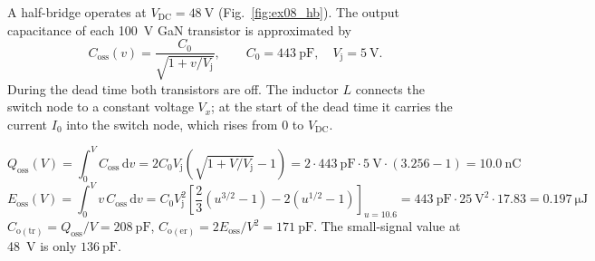 


A half-bridge operates at $V_\mathrm{DC}=\SI{48}{\volt}$ (Fig.~\ref{fig:ex08_hb}). The output capacitance of each \SI{100}{\volt} GaN transistor is approximated by
\begin{equation}
	C_\mathrm{oss}(v)=\frac{C_0}{\sqrt{1+v/V_\mathrm{j}}},\qquad C_0=\SI{443}{\pico\farad},\quad V_\mathrm{j}=\SI{5}{\volt}.
\end{equation}
During the dead time both transistors are off. The inductor $L$ connects the switch node to a constant voltage $V_x$; at the start of the dead time it carries the current $I_0$ into the switch node, which rises from 0 to $V_\mathrm{DC}$.




\begin{solutionblock}
	\begin{equation}
		Q_\mathrm{oss}(V)=\int_0^VC_\mathrm{oss}\,\mathrm{d}v=2C_0V_\mathrm{j}\left(\sqrt{1+V/V_\mathrm{j}}-1\right)=2\cdot\SI{443}{\pico\farad}\cdot\SI{5}{\volt}\cdot(3.256-1)=\SI{10.0}{\nano\coulomb}
	\end{equation}
	\begin{equation}
		E_\mathrm{oss}(V)=\int_0^Vv\,C_\mathrm{oss}\,\mathrm{d}v=C_0V_\mathrm{j}^2\left[\frac{2}{3}\left(u^{3/2}-1\right)-2\left(u^{1/2}-1\right)\right]_{u=10.6}=\SI{443}{\pico\farad}\cdot\SI{25}{\volt\squared}\cdot17.83=\SI{0.197}{\micro\joule}
	\end{equation}
	$C_\mathrm{o(tr)}=Q_\mathrm{oss}/V=\SI{208}{\pico\farad}$, $C_\mathrm{o(er)}=2E_\mathrm{oss}/V^2=\SI{171}{\pico\farad}$. The small-signal value at \SI{48}{\volt} is only $\SI{136}{\pico\farad}$.
\end{solutionblock}


